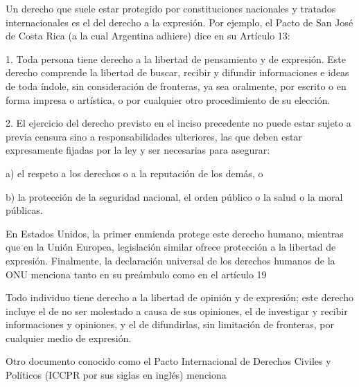 Un derecho que suele estar protegido por constituciones nacionales y tratados internacionales es el del derecho a la expresión. Por ejemplo, el Pacto de San José de Costa Rica (a la cual Argentina adhiere)\cite{humanos2018convencion} dice en su Artículo 13:

\begin{displayquote}

    1. Toda persona tiene derecho a la libertad de pensamiento y de expresión.  Este derecho comprende la libertad de buscar, recibir y difundir informaciones e ideas de toda índole, sin consideración de fronteras, ya sea oralmente, por escrito o en forma impresa o artística, o por cualquier otro procedimiento de su elección.

    2. El ejercicio del derecho previsto en el inciso precedente no puede estar sujeto a previa censura sino a responsabilidades ulteriores, las que deben estar expresamente fijadas por la ley y ser necesarias para asegurar:

    a)  el respeto a los derechos o a la reputación de los demás, o

    b) la protección de la seguridad nacional, el orden público o la salud o la moral públicas.
\end{displayquote}

En Estados Unidos, la primer enmienda protege este derecho humano, mientras que en la Unión Europea, legislación similar ofrece protección a la libertad de expresión. Finalmente, la declaración universal de los derechos humanos de la ONU  menciona tanto en su preámbulo como en el artículo 19

\begin{displayquote}
    Todo individuo tiene derecho a la libertad de opinión y de expresión; este derecho incluye el de no ser molestado a causa de sus opiniones, el de investigar y recibir informaciones y opiniones, y el de difundirlas, sin limitación de fronteras, por cualquier medio de expresión.
\end{displayquote}

Otro documento conocido como el Pacto Internacional de Derechos Civiles y Políticos (ICCPR por sus siglas en inglés) menciona

